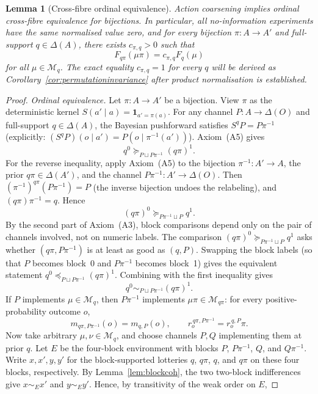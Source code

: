 \documentclass[11pt,a4paper]{article}
\newtheorem{lemma}[theorem]{Lemma}
\theoremstyle{definition}
\newcommand{\1}{\mathbf 1}
\begin{document}
\begin{lemma}[Cross-fibre ordinal equivalence]\label{lem:actionbase}
Action coarsening implies ordinal cross-fibre equivalence for bijections.  In particular, all no-information
experiments have the same normalised value zero, and for every bijection $\pi:A\to A'$ and full-support
$q\in\Delta(A)$, there exists $c_{\pi,q}>0$ such that
\[
F_{q\pi}(\mu\pi)=c_{\pi,q} F_q(\mu)
\]
for all $\mu\in\mathcal M_q$.  The exact equality $c_{\pi,q}=1$ for every $q$ will be derived as
Corollary~\ref{cor:permutationinvariance} after product normalisation is established.
\end{lemma}

\begin{proof}
\emph{Ordinal equivalence.}  Let $\pi:A\to A'$ be a bijection.  View $\pi$ as the deterministic kernel
$S(a'\mid a)=\1_{a'=\pi(a)}$.  For any channel $P:A\to\Delta(O)$ and full-support $q\in\Delta(A)$, the Bayesian
pushforward satisfies $S^qP=P\pi^{-1}$ (explicitly: $(S^qP)(o\mid a')=P(o\mid\pi^{-1}(a'))$).  Axiom~\textup{(A5)}
gives
\[
q^0\succeq_{P\sqcup P\pi^{-1}}(q\pi)^1.
\]
For the reverse inequality, apply Axiom~\textup{(A5)} to the bijection $\pi^{-1}:A'\to A$, the prior $q\pi\in\Delta(A')$,
and the channel $P\pi^{-1}:A'\to\Delta(O)$.  Then $(\pi^{-1})^{q\pi}(P\pi^{-1})=P$ (the inverse bijection undoes the
relabeling), and $(q\pi)\pi^{-1}=q$.  Hence
\[
(q\pi)^0\succeq_{P\pi^{-1}\sqcup P}q^1.
\]
By the second part of Axiom~\textup{(A3)}, block comparisons depend only on the pair of channels involved, not on
numeric labels.  The comparison $(q\pi)^0\succeq_{P\pi^{-1}\sqcup P}q^1$ asks whether $(q\pi,P\pi^{-1})$ is at least
as good as $(q,P)$.  Swapping the block labels (so that $P$ becomes block~0 and $P\pi^{-1}$ becomes block~1) gives
the equivalent statement $q^0\preceq_{P\sqcup P\pi^{-1}}(q\pi)^1$.  Combining with the first inequality gives
\[
q^0\sim_{P\sqcup P\pi^{-1}}(q\pi)^1.
\]
If $P$ implements $\mu\in\mathcal M_q$, then $P\pi^{-1}$ implements $\mu\pi\in\mathcal M_{q\pi}$: for every
positive-probability outcome $o$,
\[
m_{q\pi,P\pi^{-1}}(o)=m_{q,P}(o),
\qquad
r_o^{\,q\pi,P\pi^{-1}}=r_o^{\,q,P}\pi.
\]
Now take arbitrary $\mu,\nu\in\mathcal M_q$, and choose channels $P,Q$ implementing them at prior $q$.  Let $E$ be the
four-block environment with blocks $P$, $P\pi^{-1}$, $Q$, and $Q\pi^{-1}$.  Write $x,x',y,y'$ for the block-supported
lotteries $q$, $q\pi$, $q$, and $q\pi$ on these four blocks, respectively.  By Lemma~\ref{lem:blockcoh}, the two
two-block indifferences give $x\sim_E x'$ and $y\sim_E y'$.  Hence, by transitivity of the weak order on $E$,

\end{proof}
\end{document}
